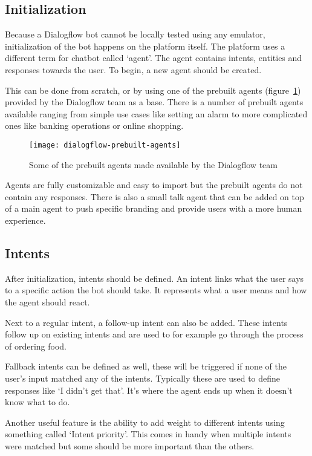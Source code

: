 \subsection{Initialization}

Because a Dialogflow bot cannot be locally tested using any emulator, initialization of the bot happens on the platform itself. The platform uses a different term for chatbot called `agent'. The agent contains intents, entities and responses towards the user. To begin, a new agent should be created.

This can be done from scratch, or by using one of the prebuilt agents (figure~\ref{fig:dialogflow-prebuilt-agents}) provided by the Dialogflow team as a base. There is a number of prebuilt agents available ranging from simple use cases like setting an alarm to more complicated ones like banking operations or online shopping.

\begin{figure}[ht]
	\centering
	\texttt{[image: dialogflow-prebuilt-agents]}\label{fig:dialogflow-prebuilt-agents}
	\caption{Some of the prebuilt agents made available by the Dialogflow team}
\end{figure}

Agents are fully customizable and easy to import but the prebuilt agents do not contain any responses. There is also a small talk agent that can be added on top of a main agent to push specific branding and provide users with a more human experience.

\subsection{Intents}

After initialization, intents should be defined. An intent links what the user says to a specific action the bot should take. It represents what a user means and how the agent should react.

Next to a regular intent, a follow-up intent can also be added. These intents follow up on existing intents and are used to for example go through the process of ordering food.

Fallback intents can be defined as well, these will be triggered if none of the user's input matched any of the intents. Typically these are used to define responses like `I didn't get that'. It's where the agent ends up when it doesn't know what to do.

Another useful feature is the ability to add weight to different intents using something called `Intent priority'. This comes in handy when multiple intents were matched but some should be more important than the others.

